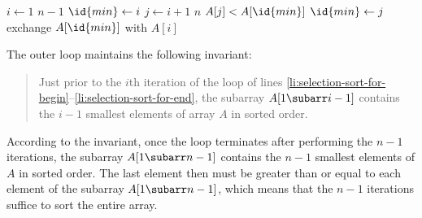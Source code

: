 \begin{codebox}
\li \For $i\gets1$ \To $n-1$ \label{li:selection-sort-for-begin}
\li     \Do $\id{min}\gets i$ \label{li:selection-sort-min-init}
\li         \For $j\gets i+1$ \To $n$
\li             \Do \If $A[j]<A[\id{min}]$
\li                     \Then $\id{min}\gets j$ \label{li:selection-sort-min-update}
                        \End
                \End
\li         exchange $A[\id{min}]$ with $A[i]$
        \End \label{li:selection-sort-for-end}
\end{codebox}

The outer  loop maintains the following invariant:
\begin{quote}
    Just prior to the $i$th iteration of the  loop of lines \ref{li:selection-sort-for-begin}--\ref{li:selection-sort-for-end}, the subarray $A[1\subarr i-1]$ contains the $i-1$ smallest elements of array $A$ in sorted order.
\end{quote}
According to the invariant, once the loop terminates after performing the $n-1$ iterations, the subarray $A[1\subarr n-1]$ contains the $n-1$ smallest elements of $A$ in sorted order.
The last element then must be greater than or equal to each element of the subarray $A[1\subarr n-1]$, which means that the $n-1$ iterations suffice to sort the entire array.

